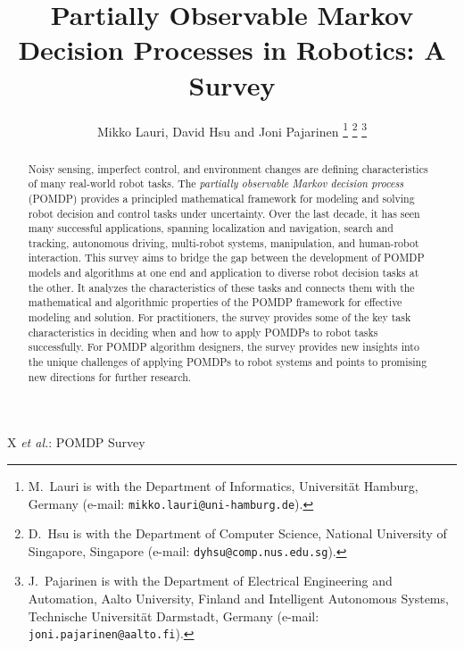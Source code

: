 \documentclass[journal]{IEEEtran}
\begin{document}
%
%
%
%
%
%
%
\title{Partially Observable Markov Decision Processes in
Robotics: A Survey}
%
%
%
%
%
%
%
%
%
%

\author{{Mikko Lauri, David Hsu and Joni Pajarinen}%
\thanks{M.~Lauri is with the Department of Informatics, Universit\"{a}t Hamburg, Germany (e-mail: {\tt\footnotesize mikko.lauri@uni-hamburg.de}).}%
\thanks{D.~Hsu is with the Department of Computer Science, National University of Singapore, Singapore (e-mail: {\tt\footnotesize dyhsu@comp.nus.edu.sg}).}%
\thanks{J.~Pajarinen is with the Department of Electrical Engineering and Automation, Aalto University, Finland and Intelligent Autonomous Systems, Technische Universit\"{a}t Darmstadt, Germany (e-mail: {\tt\footnotesize joni.pajarinen@aalto.fi}).}%
%
}

%
%
%
%
%
%
%
%
%
%
%
%
%
%
%
%
%

%
%
{X \MakeLowercase{\textit{et al.}}: POMDP Survey}
%
%
%
%
%
%
%

%
%
%
%
%

%
%

%
\maketitle

%
%
\begin{abstract}
Noisy sensing, imperfect control, and environment changes are defining characteristics of many real-world robot tasks.
The \textit{partially observable Markov decision process} (POMDP) provides a principled mathematical framework for modeling and solving robot decision and control  tasks under uncertainty.
Over the last decade, it has seen many successful applications, spanning localization and navigation, search and tracking, autonomous driving, multi-robot systems, manipulation, and human-robot interaction.
This survey aims to bridge the gap between the development of POMDP models and algorithms at one end and application to diverse robot decision tasks at the other.
It analyzes the characteristics of these tasks and connects them with the mathematical and algorithmic properties of the POMDP framework for effective modeling and solution.
For practitioners, the survey provides some of the key task characteristics in deciding when and how to apply POMDPs to robot tasks successfully.
For POMDP algorithm designers, the survey provides new insights into the unique challenges of applying POMDPs to robot systems and points to promising new  directions for further research.
\end{abstract}
\end{document}
